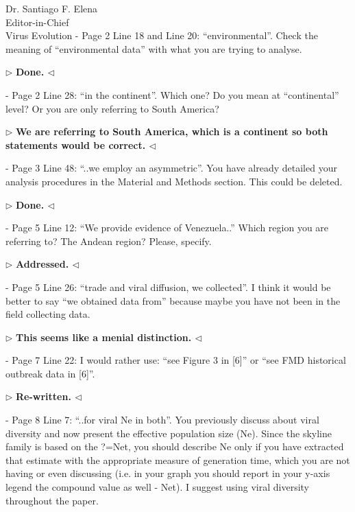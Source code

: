 \documentclass[12pt, a4paper]{letter} %
\newenvironment{reply}{$\triangleright$\bf}{$\triangleleft$}
\begin{document}
\begin{letter}{
	Dr. Santiago F. Elena\\
    Editor-in-Chief \\
    Virus Evolution
}
-       Page 2 Line 18 and Line 20: ``environmental''. 
Check the meaning of ``environmental data'' with what you are trying to analyse.

\begin{reply}
Done.
\end{reply}

-       Page 2 Line 28: ``in the continent''. 
Which one? 
Do you mean at ``continental'' level? 
Or you are only referring to South America?

\begin{reply}
We are referring to South America, which is a continent so both statements would be correct.
\end{reply}

-       Page 3 Line 48: ``..we employ an asymmetric''. 
You have already detailed your analysis procedures in the Material and Methods section. 
This could be deleted.

\begin{reply}
Done.
\end{reply}

-       Page 5 Line 12: ``We provide evidence of Venezuela..'' 
Which region you are referring to? 
The Andean region? 
Please, specify.

\begin{reply}
Addressed.
\end{reply}

-       Page 5 Line 26: ``trade and viral diffusion, we collected''. 
I think it would be better to say ``we obtained data from'' because maybe you have not been in the field collecting data.

\begin{reply}
This seems like a menial distinction. %
\end{reply}

-       Page 7 Line 22: I would rather use: ``see Figure 3 in [6]'' or ``see FMD historical outbreak data in [6]''.

\begin{reply}
Re-written.
\end{reply}

-       Page 8 Line 7: ``..for viral Ne in both''. 
You previously discuss about viral diversity and now present the effective population size (Ne). 
Since the skyline family is based on the ?=Net, you should describe Ne only if you have extracted that estimate with the appropriate measure of generation time, which you are not having or even discussing (i.e. in your graph you should report in your y-axis legend the compound value as well - Net). 
I suggest using viral diversity throughout the paper.


\end{letter}
\end{document}
